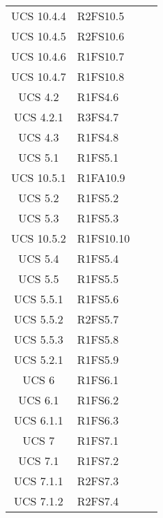 {\begin{longtable}{ c C{4cm} c c}
UCS 10.4.4 & R2FS10.5\\

UCS 10.4.5 & R2FS10.6\\

UCS 10.4.6 & R1FS10.7\\

UCS 10.4.7 & R1FS10.8\\

UCS 4.2 & R1FS4.6\\


UCS 4.2.1 & R3FS4.7\\

UCS 4.3 & R1FS4.8\\

UCS 5.1 & R1FS5.1\\

UCS 10.5.1 & R1FA10.9\\

UCS 5.2 & R1FS5.2\\

UCS 5.3 & R1FS5.3\\

UCS 10.5.2 & R1FS10.10\\

UCS 5.4 & R1FS5.4\\

UCS 5.5 & R1FS5.5\\


UCS 5.5.1 & R1FS5.6\\

UCS 5.5.2 & R2FS5.7\\

UCS 5.5.3 & R1FS5.8\\

UCS 5.2.1 & R1FS5.9\\

UCS 6 & R1FS6.1\\

UCS 6.1 & R1FS6.2\\

UCS 6.1.1 & R1FS6.3\\

UCS 7 & R1FS7.1\\

UCS 7.1 & R1FS7.2\\

UCS 7.1.1 & R2FS7.3\\

UCS 7.1.2 & R2FS7.4\\


\end{longtable}}
